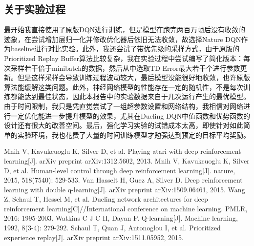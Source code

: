 \documentclass[a4paper,12pt]{article}
\begin{document}
\begin{CJK}{UTF8}{gbsn}
\subsection{关于实验过程}
最开始我直接使用了原版DQN\cite{ref1}进行训练，但是模型在跑完两百万帧后没有收敛的迹象，在尝试增加层归一化并修改优化器后依旧无法收敛，故选择Nature DQN\cite{ref2}作为baseline进行对比实验。此外，我还尝试了带优先级的采样方式，由于原版的Prioritized Replay Buffer算法\cite{ref6}比较复杂，我在实验过程中尝试编写了简化版本：每次采样若干倍于minibatch的数据，然后从中选取TD Error最大若干个进行参数更新。但是这样采样会导致训练过程波动较大，最后模型没能很好地收敛，也许原版算法能缓解这类问题。此外，神经网络模型的性能存在一定的随机性，不是每次训练都能达到最佳状态，因此本报告中的实验数据来自于几次运行产生的最优模型。由于时间限制，我只是凭直觉尝试了一组超参数设置和网络结构，我相信对网络进行一定优化能进一步提升模型的效果，尤其在Dueling DQN中值函数和优势函数的设计还有很大的改善空间。最后，强化学习实验的试错成本太高，即使针对如此简单的实验环境，我也花费了大量的时间训练模型才勉强达到预定的目标平均奖励。
\newpage
\renewcommand\refname{参考文献}
\begin{thebibliography}{99}
	Mnih V, Kavukcuoglu K, Silver D, et al. Playing atari with deep reinforcement learning[J]. arXiv preprint arXiv:1312.5602, 2013.
	Mnih V, Kavukcuoglu K, Silver D, et al. Human-level control through deep reinforcement learning[J]. nature, 2015, 518(7540): 529-533.
	Van Hasselt H, Guez A, Silver D. Deep reinforcement learning with double q-learning[J]. arXiv preprint arXiv:1509.06461, 2015.
	Wang Z, Schaul T, Hessel M, et al. Dueling network architectures for deep reinforcement learning[C]//International conference on machine learning. PMLR, 2016: 1995-2003.
	Watkins C J C H, Dayan P. Q-learning[J]. Machine learning, 1992, 8(3-4): 279-292.
	Schaul T, Quan J, Antonoglou I, et al. Prioritized experience replay[J]. arXiv preprint arXiv:1511.05952, 2015.
\end{thebibliography}
\end{CJK}
\end{document}
